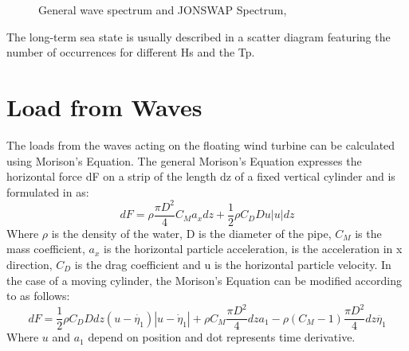 \begin{figure}[H]
\hfill
{}\hfill
\caption[$\; \:$General wave spectrum and JONSWAP Spectrum]{General wave spectrum and JONSWAP Spectrum, \cite{Faltinsen1990}}
\label{fig:spectrum}
\end{figure}

\noindent The long-term sea state is usually described in a scatter diagram featuring the number of occurrences for different Hs and the Tp.\newline

\section{Load from Waves}
The loads from the waves acting on the floating wind turbine can be calculated using Morison's Equation. The general Morison's Equation expresses the horizontal force dF on a strip of the length dz of a fixed vertical cylinder and is formulated in \cite{BP2007} as:
\begin{equation}
    dF=\rho \frac{\pi D^2}{4} C_M a_x dz +\frac{1}{2} \rho C_D Du |u|dz
    \label{eq:morison}
\end{equation}
\noindent Where $\rho$ is the density of the water, D is the diameter of the pipe, $C_M$ is the mass coefficient, $a_x$ is the horizontal particle acceleration, is the acceleration in x direction, $C_D$ is the drag coefficient and u is the horizontal particle velocity. \newline
\newline
\newline
In the case of a moving cylinder, the Morison's Equation can be modified according to \cite{Faltinsen1990} as follows:
\begin{equation}
    dF=\frac{1}{2}\rho C_D D dz(u-\dot{\eta_1}) |u-\dot \eta_1| +  \rho C_M \frac{\pi D^2}{4} dz a_1 -\rho (C_M-1) \frac{\pi D^2}{4} dz \ddot{\eta_1}
    \label{eq:movemorison}
\end{equation}
Where $u$ and $a_1$ depend on position and dot represents time derivative.
